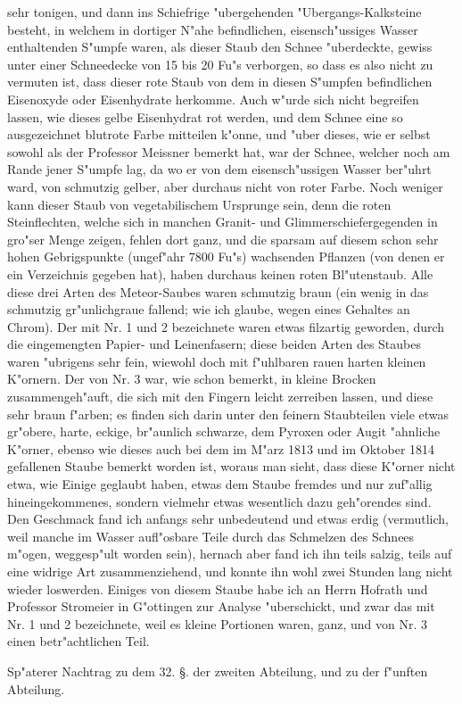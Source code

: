 \documentclass[a4paper, 11pt, oneside, polutonikogreek, german]{article}
\begin{document}
sehr tonigen, und dann ins Schiefrige "ubergehenden "Ubergangs-Kalksteine besteht, in welchem in dortiger N"ahe befindlichen, eisensch"ussiges Wasser enthaltenden S"umpfe waren, als dieser Staub den Schnee "uberdeckte, gewiss unter einer Schneedecke von 15 bis 20 Fu"s verborgen, so dass es also nicht zu vermuten ist, dass dieser rote Staub von dem in diesen S"umpfen befindlichen Eisenoxyde oder Eisenhydrate herkomme. Auch w"urde sich nicht begreifen lassen, wie dieses gelbe Eisenhydrat rot werden, und dem Schnee eine so ausgezeichnet blutrote Farbe mitteilen k"onne, und "uber dieses, wie er selbst sowohl als der Professor Meissner bemerkt hat, war der Schnee, welcher noch am Rande jener S"umpfe lag, da wo er von dem eisensch"ussigen Wasser ber"uhrt ward, von schmutzig gelber, aber durchaus nicht von roter Farbe. Noch weniger kann dieser Staub von vegetabilischem Ursprunge sein, denn die roten Steinflechten, welche sich in manchen Granit- und Glimmerschiefergegenden in gro"ser Menge zeigen, fehlen dort ganz, und die sparsam auf diesem schon sehr hohen Gebrigspunkte (ungef"ahr 7800 Fu"s) wachsenden Pflanzen (von denen er ein Verzeichnis gegeben hat), haben durchaus keinen roten Bl"utenstaub. Alle diese drei Arten des Meteor-Saubes waren schmutzig braun (ein wenig in das schmutzig gr"unlichgraue fallend; wie ich glaube, wegen eines Gehaltes an Chrom). Der mit Nr. 1 und 2 bezeichnete waren etwas filzartig geworden, durch die eingemengten Papier- und Leinenfasern; diese beiden Arten des Staubes waren "ubrigens sehr fein, wiewohl doch mit f"uhlbaren rauen harten kleinen K"ornern. Der von Nr. 3 war, wie schon bemerkt, in kleine Brocken zusammengeh"auft, die sich mit den Fingern leicht zerreiben lassen, und diese sehr braun f"arben; es finden sich darin unter den feinern Staubteilen viele etwas gr"obere, harte, eckige, br"aunlich schwarze, dem Pyroxen oder Augit "ahnliche K"orner, ebenso wie dieses auch bei dem im M"arz 1813 und im Oktober 1814 gefallenen Staube bemerkt worden ist, woraus man sieht, dass diese K"orner nicht etwa, wie Einige geglaubt haben, etwas dem Staube fremdes und nur zuf"allig hineingekommenes, sondern vielmehr etwas wesentlich dazu geh"orendes sind. Den Geschmack fand ich anfangs sehr unbedeutend und etwas erdig (vermutlich, weil manche im Wasser aufl"osbare Teile durch das Schmelzen des Schnees m"ogen, weggesp"ult worden sein), hernach aber fand ich ihn teils salzig, teils auf eine widrige Art zusammenziehend, und konnte ihn wohl zwei Stunden lang nicht wieder loswerden. Einiges von diesem Staube habe ich an Herrn Hofrath und Professor Stromeier in G"ottingen zur Analyse "uberschickt, und zwar das mit Nr. 1 und 2 bezeichnete, weil es kleine Portionen waren, ganz, und von Nr. 3 einen betr"achtlichen Teil.
\begin{center}
Sp"aterer Nachtrag zu dem 32. §. der zweiten Abteilung, und zu der f"unften Abteilung. 
\end{center}
\end{document}
